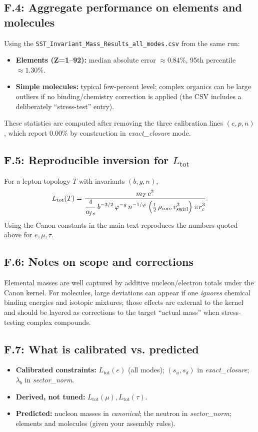 \subsection*{F.4: Aggregate performance on elements and molecules}
Using the \texttt{SST\_Invariant\_Mass\_Results\_all\_modes.csv} from the same run:
\begin{itemize}
	\item \textbf{Elements (Z=1–92):} median absolute error \(\approx 0.84\%\), 95th percentile \(\approx 1.30\%\).
	\item \textbf{Simple molecules:} typical few-percent level; complex organics can be large outliers if no binding/chemistry correction is applied (the CSV includes a deliberately “stress-test” entry).
\end{itemize}
These statistics are computed after removing the three calibration lines \((e,p,n)\), which report \(0.00\%\) by construction in \textit{exact\_closure} mode.

\subsection*{F.5: Reproducible inversion for \(L_{\text{tot}}\)}
For a lepton topology \(T\) with invariants \((b,g,n)\),
\[
	L_{\text{tot}}(T)
	= \frac{ m_T\,c^2 }{ \displaystyle \frac{4}{\alpha_{\!fs}}\,b^{-3/2}\,\varphi^{-g}\,n^{-1/\varphi}\;
	\Big(\tfrac12\,\rho_{\rm core}\,v_{\rm swirl}^{2}\Big)\;\pi r_c^{3} }.
\]
Using the Canon constants in the main text reproduces the numbers quoted above for \(e,\mu,\tau\).

\subsection*{F.6: Notes on scope and corrections}
Elemental masses are well captured by additive nucleon/electron totals under the Canon kernel. For molecules, large deviations can appear if one \emph{ignores} chemical binding energies and isotopic mixtures; those effects are external to the kernel and should be layered as corrections to the target “actual mass” when stress-testing complex compounds.

\subsection*{F.7: What is calibrated vs. predicted}
\begin{itemize}
	\item \textbf{Calibrated constraints:} \(L_{\text{tot}}(e)\) (all modes); \((s_u,s_d)\) in \textit{exact\_closure}; \(\lambda_b\) in \textit{sector\_norm}.
	\item \textbf{Derived, not tuned:} \(L_{\text{tot}}(\mu),L_{\text{tot}}(\tau)\).
	\item \textbf{Predicted:} nucleon masses in \textit{canonical}; the neutron in \textit{sector\_norm}; elements and molecules (given your assembly rules).
\end{itemize}

